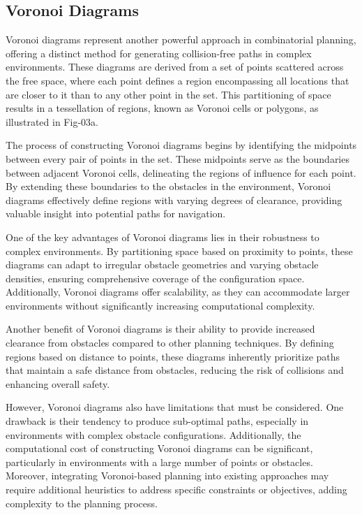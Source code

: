 \subsection{Voronoi Diagrams}

Voronoi diagrams represent another powerful approach in combinatorial planning, offering a distinct method for generating collision-free paths in complex environments. These diagrams are derived from a set of points scattered across the free space, where each point defines a region encompassing all locations that are closer to it than to any other point in the set. This partitioning of space results in a tessellation of regions, known as Voronoi cells or polygons, as illustrated in Fig-03a.

\vspace*{6mm}


The process of constructing Voronoi diagrams begins by identifying the midpoints between every pair of points in the set. These midpoints serve as the boundaries between adjacent Voronoi cells, delineating the regions of influence for each point. By extending these boundaries to the obstacles in the environment, Voronoi diagrams effectively define regions with varying degrees of clearance, providing valuable insight into potential paths for navigation.

\vspace*{6mm}


One of the key advantages of Voronoi diagrams lies in their robustness to complex environments. By partitioning space based on proximity to points, these diagrams can adapt to irregular obstacle geometries and varying obstacle densities, ensuring comprehensive coverage of the configuration space. Additionally, Voronoi diagrams offer scalability, as they can accommodate larger environments without significantly increasing computational complexity.

\vspace*{6mm}


Another benefit of Voronoi diagrams is their ability to provide increased clearance from obstacles compared to other planning techniques. By defining regions based on distance to points, these diagrams inherently prioritize paths that maintain a safe distance from obstacles, reducing the risk of collisions and enhancing overall safety.

\vspace*{6mm}


However, Voronoi diagrams also have limitations that must be considered. One drawback is their tendency to produce sub-optimal paths, especially in environments with complex obstacle configurations. Additionally, the computational cost of constructing Voronoi diagrams can be significant, particularly in environments with a large number of points or obstacles. Moreover, integrating Voronoi-based planning into existing approaches may require additional heuristics to address specific constraints or objectives, adding complexity to the planning process.

